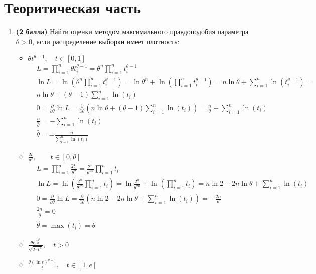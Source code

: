 \documentclass{assignment}
\begin{document}

\section*{Теоритическая часть}
\begin{enumerate}
    \item \textbf{(2 балла)} Найти оценки методом максимального правдоподобия параметра $\theta > 0$, если распределение выборки имеет плотность:
    \begin{itemize}
        \item $\theta t^{\theta - 1}, \quad t \in [0, 1]$
        \start
        \begin{align*}
            &L = \prod_{i=1}^{n} \theta t_i^{\theta - 1} = \theta^n \prod_{i=1}^{n} t_i^{\theta - 1} \\
            &\ln L = \ln (\theta^n \prod_{i=1}^{n} t_i^{\theta - 1}) = \ln \theta^n + \ln (\prod_{i=1}^{n} t_i^{\theta - 1}) = n \ln \theta + \sum_{i=1}^{n} \ln (t_i^{\theta - 1}) = \\
            &n \ln \theta + (\theta - 1)\sum_{i=1}^{n} \ln (t_i) \\
            &0 = \frac{\partial}{\partial \theta}\ln L = \frac{\partial}{\partial \theta}(n \ln \theta + (\theta - 1)\sum_{i=1}^{n} \ln (t_i)) = \frac{n}{\theta} + \sum_{i=1}^{n}\ln (t_i) \\
            &\frac{n}{\hat{\theta}} = -\sum_{i=1}^{n}\ln (t_i) \\
            & \hat{\theta} = - \frac{n}{\sum_{i=1}^{n}\ln (t_i)}
        \end{align*}
        \finish
        \item $\displaystyle \frac{2t}{\theta^2},\quad \quad  t \in [0, \theta]$
        \start
        \begin{align*}
            &L = \prod_{i=1}^{n} \frac{2t_i}{\theta^2} = \frac{2^n}{\theta^{2n}} \prod_{i=1}^{n} t_i \\
            &\ln L = \ln (\frac{2^n}{\theta^{2n}} \prod_{i=1}^{n} t_i) = \ln \frac{2^n}{\theta^{2n}} + \ln (\prod_{i=1}^{n} t_i) = n \ln 2 - 2n \ln \theta + \sum_{i=1}^{n} \ln (t_i) \\
            &0 = \frac{\partial}{\partial \theta}\ln L = \frac{\partial}{\partial \theta}(n\ln 2 - 2n \ln \theta + \sum_{i=1}^{n} \ln (t_i)) = -\frac{2n}{\theta} \\
            &\frac{2n}{\hat{\theta}} = 0 \\
            &\hat{\theta} = \max (t_i) = \theta
        \end{align*}
        \finish
        \item $\displaystyle \frac{\theta e^{\frac{-\theta^2}{2t}}}{\sqrt{2 \pi t^3}}, \quad t > 0$
        \item $\displaystyle \frac{\theta (\ln{t})^{\theta - 1}}{t}, \quad t \in [1, e]$
    \end{itemize}


\end{enumerate}
\end{document}
